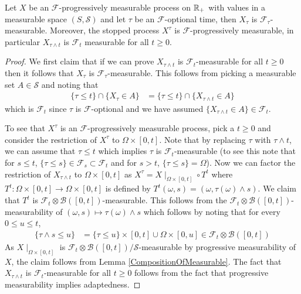 \begin{lem}\label{StoppedProgressivelyMeasurableProcess}Let $X$ be an $\mathcal{F}$-progressively measurable process on
  $\mathbb{R}_+$ with values in a measurable space $(S, \mathcal{S})$ and
  let $\tau$ be an $\mathcal{F}$-optional time, then $X_\tau$ is
  $\mathcal{F}_\tau$-measurable.  Moreover, the stopped process $X^\tau$ is
$\mathcal{F}$-progressively measurable, in particular $X_{\tau \wedge
  t}$ is  $\mathcal{F}_t$ measurable for all $t \geq 0$.
\end{lem}
\begin{proof}
We first claim that if we can prove $X_{\tau \wedge t}$ is
$\mathcal{F}_t$-measurable for all $t \geq 0$ then it follows that
$X_\tau$ is $\mathcal{F}_\tau$-measurable.  This follows from picking
a measurable set $A \in \mathcal{S}$ and noting that
\begin{align*}
\lbrace \tau \leq t \rbrace \cap \lbrace X_\tau \in A \rbrace &=
\lbrace \tau \leq t \rbrace \cap \lbrace X_{\tau \wedge t} \in A \rbrace
\end{align*}
which is $\mathcal{F}_t$ since $\tau$ is $\mathcal{F}$-optional and we
have assumed $\lbrace X_{\tau \wedge t} \in A \rbrace \in
\mathcal{F}_t$.

To see that $X^{\tau}$ is an $\mathcal{F}$-progressively
measurable process, pick a $t \geq 0$ and consider the restriction of
$X^{\tau}$ to $\Omega \times [0,t]$.   Note that by replacing $\tau$
with $\tau \wedge t$, we can assume that $\tau \leq t$ which implies
$\tau$ is $\mathcal{F}_t$-measurable (to see this note that for $s
\leq t$, $\lbrace \tau \leq s \rbrace \in \mathcal{F}_s \subset
\mathcal{F}_t$ and for $s > t$,
$\lbrace \tau \leq s \rbrace = \Omega$). 
Now we can factor the restriction of
$X_{\tau \wedge t}$ to $\Omega \times [0,t]$ as $X^{\tau} =
X\mid_{\Omega \times [0,t]} \circ T^t$ where
$T^t : \Omega \times [0,t] \to \Omega \times [0,t]$ is defined by
$T^t(\omega, s) = (\omega, \tau(\omega) \wedge s)$.   We claim that $T^t$ is
$\mathcal{F}_t \otimes \mathcal{B}([0,t])$-measurable.  This follows
from the $\mathcal{F}_t \otimes \mathcal{B}([0,t])$-measurability of
$(\omega, s) \mapsto \tau(\omega) \wedge s$ which follows by noting
that for every $0 \leq u \leq t$,
\begin{align*}
\lbrace \tau \wedge s \leq u \rbrace &= \lbrace \tau \leq u \rbrace
\times [0,t] \cup \Omega \times [0,u] \in \mathcal{F}_t \otimes \mathcal{B}([0,t])
\end{align*}
As $X\mid_{\Omega \times [0,t]}$ is $\mathcal{F}_t \otimes
\mathcal{B}([0,t])/\mathcal{S}$-measurable by progressive
measurability of $X$, the claim follows from Lemma
\ref{CompositionOfMeasurable}.  The fact that $X_{\tau \wedge t}$ is
$\mathcal{F}_t$-measurable for all $t \geq 0$ follows from the fact
that progressive measurability implies adaptedness.
\end{proof}

